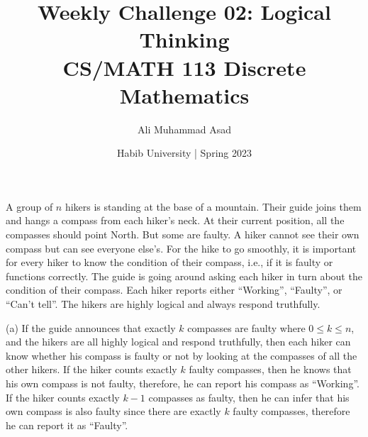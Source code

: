 \documentclass[a4paper]{exam}
\title{Weekly Challenge 02: Logical Thinking\\CS/MATH 113 Discrete Mathematics}
\author{Ali Muhammad Asad}  %
\date{Habib University | Spring 2023}
\begin{document}
\maketitle

\begin{questions}
  
  A group of $n$ hikers is standing at the base of a mountain. Their guide joins them and hangs a compass from each hiker's neck. At their current position, all the compasses should point North. But some are faulty. A hiker cannot see their own compass but can see everyone else's. For the hike to go smoothly, it is important for every hiker to know the condition of their compass, i.e., if it is faulty or functions correctly. The guide is going around asking each hiker in turn about the condition of their compass. Each hiker reports either ``Working'', ``Faulty'', or ``Can't tell''. The hikers are highly logical and always respond truthfully.


  \begin{solution}
    
    (a) If the guide announces that exactly $k$ compasses are faulty where $ 0 \leq k \leq n $, and the hikers are all highly logical and respond truthfully, then each hiker can know whether his compass is faulty or not by looking at the compasses of all the other hikers. If the hiker counts exactly $ k $ faulty compasses, then he knows that his own compass is not faulty, therefore, he can report his compass as ``Working''. \\ 
    If the hiker counts exactly $ k - 1 $ compasses as faulty, then he can infer that his own compass is also faulty since there are exactly $ k $ faulty compasses, therefore he can report it as ``Faulty''.


\end{solution}
\end{questions}
\end{document}
